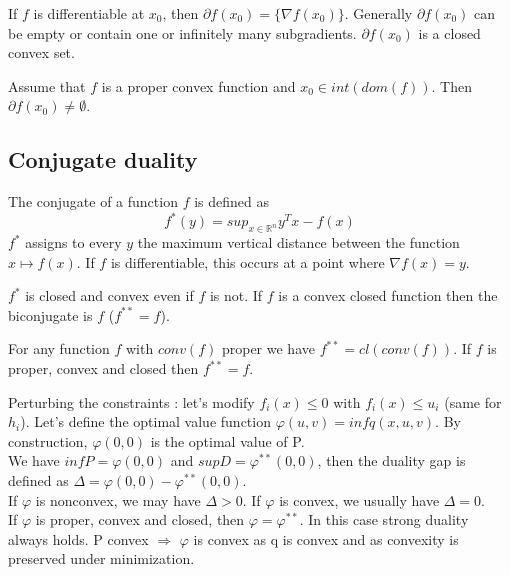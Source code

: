 \documentclass[../main.tex]{subfiles}
\begin{document}
\warning If $f$ is differentiable at $x_0$, then $\partial f(x_0) = \{ \nabla f(x_0)\}$. Generally $\partial f(x_0)$ can be empty or contain one or infinitely many subgradients. $\partial f(x_0)$ is a closed convex set.\\

\begin{theorem}
    Assume that $f$ is a proper convex function and $x_0 \in int(dom(f))$. Then $\partial f(x_0) \neq \emptyset$.
\end{theorem}

\subsection{Conjugate duality}
The conjugate of a function $f$ is defined as \begin{equation}
    f^* (y) = sup_{x\in \mathbb{R}^n} y^T x - f(x)
\end{equation}
$f^*$ assigns to every $y$ the maximum vertical distance between the function $x \mapsto f(x)$. If $f$ is differentiable, this occurs at a point where $\nabla f(x) = y$.

\warning $f^*$ is closed and convex even if $f$ is not. If $f$ is a convex closed function then the biconjugate is $f$ ($f^{**} = f$).\\

\begin{theorem}
    For any function $f$ with $conv(f)$ proper we have $f^{**} = cl(conv(f))$. If $f$ is proper, convex and closed then $f^{**} = f$.
\end{theorem}

Perturbing the constraints : let's modify $f_i(x) \leq 0$ with $f_i(x) \leq u_i$ (same for $h_i$). Let's define the optimal value function $\varphi (u,v) = inf q(x,u, v)$. By construction, $\varphi(0,0)$ is the optimal value of P. \\
We have $inf P = \varphi(0,0)$ and $sup D = \varphi^{**} (0,0)$, then the duality gap is defined as $\Delta = \varphi(0,0) - \varphi^{**} (0,0)$.\\

If $\varphi$ is nonconvex, we may have $\Delta >0$. If $\varphi$ is convex, we usually have $\Delta = 0$.\\
\warning If $\varphi$ is proper, convex and closed, then $\varphi = \varphi^{**}$. In this case strong duality always holds. P convex $\Rightarrow$ $\varphi$ is convex as q is convex and as convexity is preserved under minimization.\\
\end{document}
